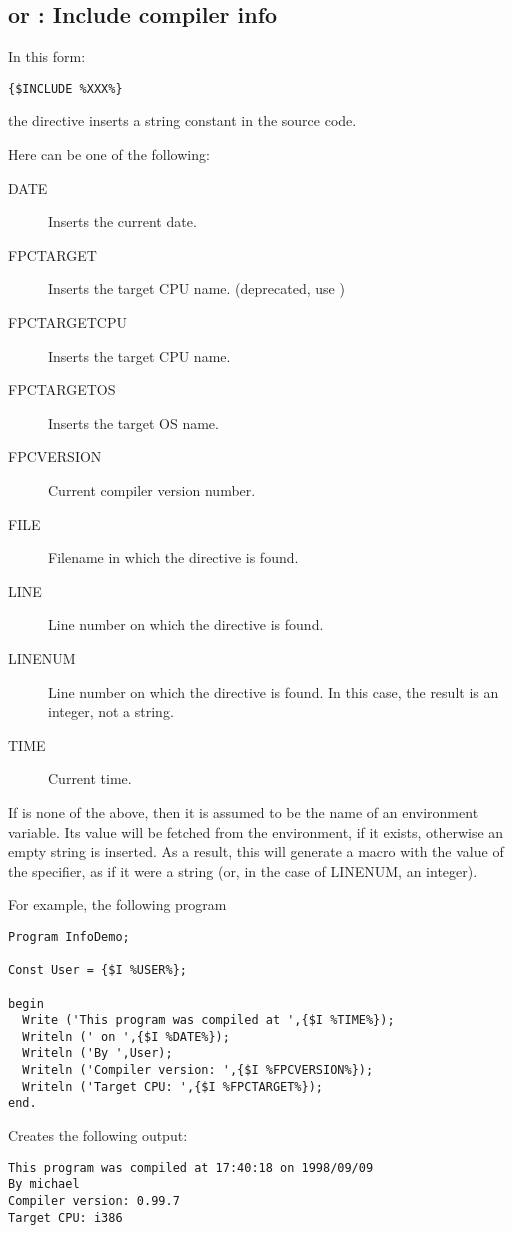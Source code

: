 \subsection{ or  : Include compiler info}
In this form:
\begin{verbatim}
{$INCLUDE %XXX%}
\end{verbatim}
the  directive inserts a string constant in the source
code. 

Here  can be one of the following:
\begin{description}
\item[DATE] Inserts the current date.
\item[FPCTARGET] Inserts the target CPU name. (deprecated, use
)
\item[FPCTARGETCPU] Inserts the target CPU name.
\item[FPCTARGETOS] Inserts the target OS name.
\item[FPCVERSION] Current compiler version number.
\item[FILE] Filename in which the directive is found.
\item[LINE] Line number on which the directive is found.
\item[LINENUM] Line number on which the directive is found. In this case,
the result is an integer, not a string.
\item[TIME] Current time.
\end{description}
If  is none of the above, then it is assumed to be the name of
an environment variable. Its value will be fetched from the environment,
if it exists, otherwise an empty string is inserted.
As a result, this will generate a macro with the value of the 
specifier, as if it were a string (or, in the case of LINENUM, an integer).  

For example, the following program
\begin{verbatim}
Program InfoDemo;

Const User = {$I %USER%};

begin
  Write ('This program was compiled at ',{$I %TIME%});
  Writeln (' on ',{$I %DATE%});
  Writeln ('By ',User);
  Writeln ('Compiler version: ',{$I %FPCVERSION%});
  Writeln ('Target CPU: ',{$I %FPCTARGET%});
end.
\end{verbatim}
Creates the following output:
\begin{verbatim}
This program was compiled at 17:40:18 on 1998/09/09
By michael
Compiler version: 0.99.7
Target CPU: i386
\end{verbatim}

